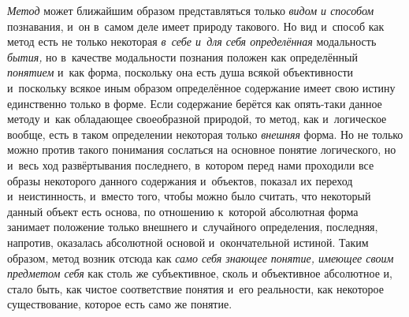 {\em Метод} может ближайшим
образом представляться только {\em видом
и способом} познавания, и~он в~самом деле имеет природу
такового. Но вид и~способ как метод есть не только некоторая
{\em в~себе и~для себя определённая}
модальность {\em бытия,}
но в~качестве модальности познания положен как определённый
{\em понятием} и~как
форма, поскольку она есть душа всякой объективности и~поскольку всякое иным
образом определённое содержание имеет свою истину единственно только в
форме. Если содержание берётся как опять-таки данное методу и~как
обладающее своеобразной природой, то метод, как и~логическое вообще, есть в
таком определении некоторая только
{\em внешняя} форма. Но
не только можно против такого понимания сослаться на основное понятие
логического, но и~весь ход развёртывания последнего, в~котором перед нами
проходили все образы некоторого данного содержания и~объектов, показал их
переход и~неистинность, и~вместо того, чтобы можно было считать, что
некоторый данный объект есть основа, по отношению к~которой абсолютная
форма занимает положение только внешнего и~случайного определения,
последняя, напротив, оказалась абсолютной основой и~окончательной истиной.
Таким образом, метод возник отсюда как
{\em само себя знающее понятие, имеющее
своим предметом себя} как столь же субъективное, сколь и
объективное абсолютное и, стало быть, как чистое соответствие понятия и~его
реальности, как некоторое существование, которое есть само же понятие.

